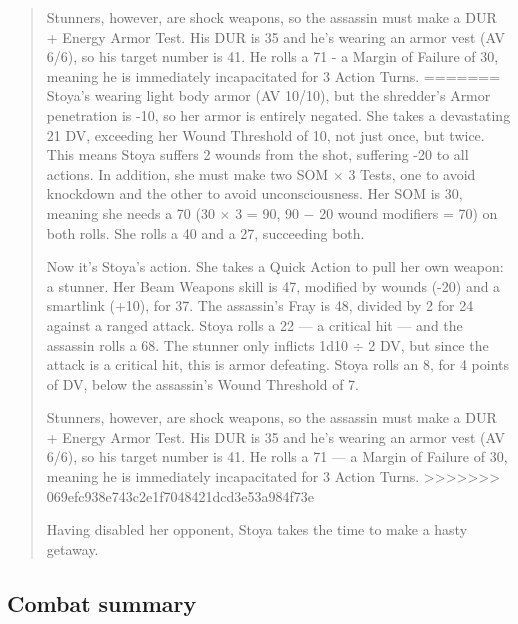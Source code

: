 \begin{quotation}
Stunners, however, are shock weapons, so the assassin must make a DUR + Energy Armor Test. His DUR is 35 and he’s wearing an armor vest (AV 6/6), so his target number is 41. He rolls a 71 - a Margin of Failure of 30, meaning he is immediately incapacitated for 3 Action Turns.
=======
Stoya’s wearing light body armor (AV 10/10), but the shredder’s Armor penetration is -10, so her armor is entirely negated. She takes a devastating 21 DV, exceeding her Wound Threshold of 10, not just once, but twice. This means Stoya suffers 2 wounds from the shot, suffering -20 to all actions. In addition, she must make two SOM $\times$ 3 Tests, one to avoid knockdown and the other to avoid unconsciousness. Her SOM is 30, meaning she needs a 70 (30 $\times$ 3 = 90, 90 $-$ 20 wound modifiers = 70) on both rolls. She rolls a 40 and a 27, succeeding both.

Now it’s Stoya’s action. She takes a Quick Action to pull her own weapon: a stunner. Her Beam Weapons skill is 47, modified by wounds (-20) and a smartlink (+10), for 37. The assassin’s Fray is 48, divided by 2 for 24 against a ranged attack. Stoya rolls a 22 --- a critical hit --- and the assassin rolls a 68. The stunner only inflicts 1d10 $\div$ 2 DV, but since the attack is a critical hit, this is armor defeating. Stoya rolls an 8, for 4 points of DV, below the assassin’s Wound Threshold of 7.

Stunners, however, are shock weapons, so the assassin must make a DUR + Energy Armor Test. His DUR is 35 and he’s wearing an armor vest (AV 6/6), so his target number is 41. He rolls a 71 --- a Margin of Failure of 30, meaning he is immediately incapacitated for 3 Action Turns.
>>>>>>> 069efc938e743c2e1f7048421dcd3e53a984f73e

Having disabled her opponent, Stoya takes the time to make a hasty getaway.
\end{quotation}


\subsection{Combat summary}

